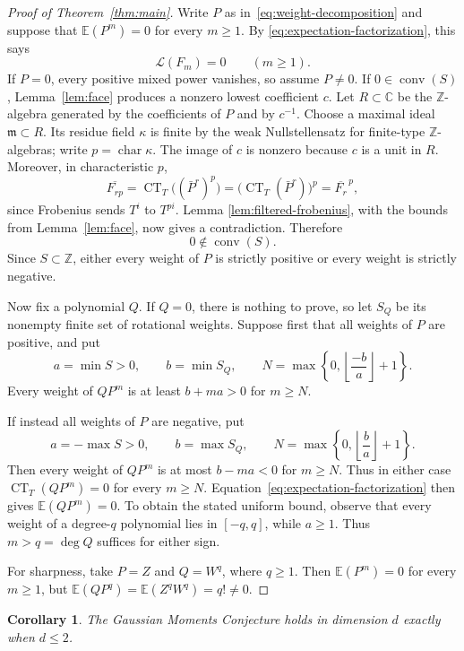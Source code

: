 \documentclass[11pt]{article}
\newtheorem{corollary}[theorem]{Corollary}
\newcommand{\C}{\mathbb C}
\newcommand{\Z}{\mathbb Z}
\newcommand{\E}{\mathbb E}
\newcommand{\CT}{\operatorname{CT}}
\newcommand{\conv}{\operatorname{conv}}
\begin{document}
\begin{proof}[Proof of Theorem~\ref{thm:main}]
Write \(P\) as in~\eqref{eq:weight-decomposition} and suppose that
\(\E(P^m)=0\) for every \(m\geq1\).  By
\eqref{eq:expectation-factorization}, this says
\[
  \mathcal L(F_m)=0\qquad(m\geq1).
\]
If \(P=0\), every positive mixed power vanishes, so assume \(P\neq0\).
If \(0\in\conv(S)\), Lemma~\ref{lem:face} produces a nonzero lowest
coefficient \(c\).  Let \(R\subset\C\) be the \(\Z\)-algebra generated by
the coefficients of \(P\) and by \(c^{-1}\).  Choose a maximal ideal
\(\mathfrak m\subset R\).  Its residue field \(\kappa\) is finite by the
weak Nullstellensatz for finite-type \(\Z\)-algebras; write
\(p=\operatorname{char}\kappa\).  The image of \(c\) is nonzero because
\(c\) is a unit in \(R\).  Moreover, in characteristic \(p\),
\[
  \overline{F_{rp}}
  =\CT_T\bigl((\bar P^r)^p\bigr)
  =\bigl(\CT_T(\bar P^r)\bigr)^p
  =\overline{F_r}^{\,p},
\]
since Frobenius sends \(T^i\) to \(T^{pi}\).  Lemma
\ref{lem:filtered-frobenius}, with the bounds from Lemma~\ref{lem:face},
now gives a contradiction.  Therefore
\[
  0\notin\conv(S).
\]
Since \(S\subset\Z\), either every weight of \(P\) is strictly positive or
every weight is strictly negative.

Now fix a polynomial \(Q\).  If \(Q=0\), there is nothing to prove, so let
\(S_Q\) be its nonempty finite set of rotational weights.  Suppose first
that all weights of \(P\) are positive, and put
\[
  a=\min S>0,\qquad b=\min S_Q,\qquad
  N=\max\left\{0,\left\lfloor\frac{-b}{a}\right\rfloor+1\right\}.
\]
Every weight of \(QP^m\) is at least \(b+ma>0\) for \(m\geq N\).

If instead all weights of \(P\) are negative, put
\[
  a=-\max S>0,\qquad b=\max S_Q,\qquad
  N=\max\left\{0,\left\lfloor\frac{b}{a}\right\rfloor+1\right\}.
\]
Then every weight of \(QP^m\) is at most \(b-ma<0\) for \(m\geq N\).
Thus in either case \(\CT_T(QP^m)=0\) for every \(m\geq N\).
Equation~\eqref{eq:expectation-factorization} then gives
\(\E(QP^m)=0\).  To obtain the stated uniform bound, observe that every
weight of a degree-\(q\) polynomial lies in \([-q,q]\), while \(a\geq1\).
Thus \(m>q=\deg Q\) suffices for either sign.

For sharpness, take \(P=Z\) and \(Q=W^q\), where \(q\geq1\).  Then
\(\E(P^m)=0\) for every \(m\geq1\), but
\(\E(QP^q)=\E(Z^qW^q)=q!\ne0\).
\end{proof}

\begin{corollary}\label{cor:classification}
The Gaussian Moments Conjecture holds in dimension \(d\) exactly when
\(d\leq2\).
\end{corollary}
\end{document}
